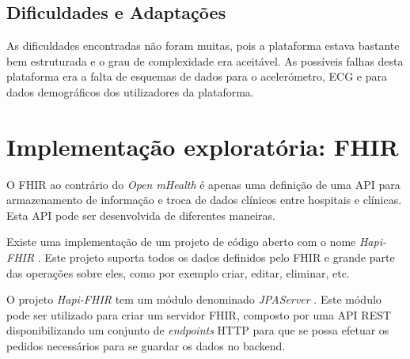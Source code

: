 \subsection{Dificuldades e Adaptações}

As dificuldades encontradas não foram muitas, pois a plataforma estava bastante bem estruturada e o grau de complexidade era aceitável. As possíveis falhas desta plataforma era a falta de esquemas de dados para o acelerómetro, \gls{ECG} e para dados demográficos dos utilizadores da plataforma.

\section{Implementação exploratória: FHIR}
O \gls{FHIR} ao contrário do \textit{Open mHealth} é apenas uma definição de uma \gls{API} para armazenamento de informação e troca de dados clínicos entre hospitais e clínicas. Esta \gls{API} pode ser desenvolvida de diferentes maneiras. \par 
Existe uma implementação de um projeto de código aberto com o nome \textit{Hapi-FHIR} . Este projeto suporta todos os dados definidos pelo \gls{FHIR} e grande parte das operações sobre eles, como por exemplo criar, editar, eliminar, etc.
\par 
O projeto \textit{Hapi-FHIR} tem um módulo denominado \textit{JPAServer}  \cite{jpa-server}. Este módulo pode ser utilizado para criar um servidor \gls{FHIR}, composto por uma \gls{API} \gls{REST} disponibilizando um conjunto de \textit{endpoints} \gls{HTTP} para que se possa efetuar os pedidos necessários para se guardar os dados no backend. \par


